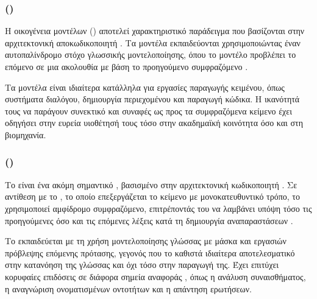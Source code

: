 \subsubsection{ ()}

Η οικογένεια μοντέλων  () αποτελεί χαρακτηριστικό παράδειγμα  που βασίζονται στην αρχιτεκτονική αποκωδικοποιητή . Τα μοντέλα  εκπαιδεύονται χρησιμοποιώντας έναν αυτοπαλίνδρομο στόχο γλωσσικής μοντελοποίησης, όπου το μοντέλο προβλέπει το επόμενο  σε μια ακολουθία με βάση το προηγούμενο συμφραζόμενο \cite{brown2020language}.

Τα μοντέλα  είναι ιδιαίτερα κατάλληλα για εργασίες παραγωγής κειμένου, όπως συστήματα διαλόγου, δημιουργία περιεχομένου και παραγωγή κώδικα. Η ικανότητά τους να παράγουν συνεκτικό και συναφές ως προς τα συμφραζόμενα κείμενο έχει οδηγήσει στην ευρεία υιοθέτησή τους τόσο στην ακαδημαϊκή κοινότητα όσο και στη βιομηχανία.

\subsubsection{ ()}

Το  είναι ένα ακόμη σημαντικό , βασισμένο στην αρχιτεκτονική κωδικοποιητή . Σε αντίθεση με το , το οποίο επεξεργάζεται το κείμενο με μονοκατευθυντικό τρόπο, το  χρησιμοποιεί αμφίδρομο συμφραζόμενο, επιτρέποντάς του να λαμβάνει υπόψη τόσο τις προηγούμενες όσο και τις επόμενες λέξεις κατά τη δημιουργία αναπαραστάσεων \cite{devlin2019bert}.

Το  εκπαιδεύεται με τη χρήση μοντελοποίησης γλώσσας με μάσκα και εργασιών πρόβλεψης επόμενης πρότασης, γεγονός που το καθιστά ιδιαίτερα αποτελεσματικό στην κατανόηση της γλώσσας και όχι τόσο στην παραγωγή της. Έχει επιτύχει κορυφαίες επιδόσεις σε διάφορα σημεία αναφοράς , όπως η ανάλυση συναισθήματος, η αναγνώριση ονοματισμένων οντοτήτων και η απάντηση ερωτήσεων.